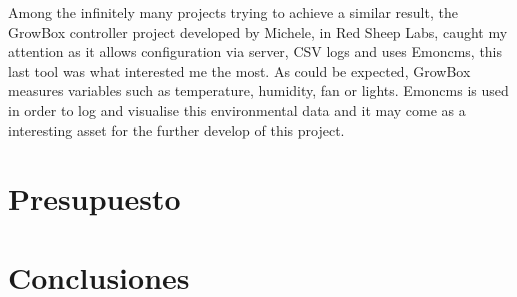 Among the infinitely many projects trying to achieve a similar result, the GrowBox controller project developed by Michele, in Red Sheep Labs\cite{growbox}, caught my attention as it allows configuration via server, CSV logs and uses Emoncms, this last tool was what interested me the most. As could be expected, GrowBox measures variables such as temperature, humidity, fan or lights. Emoncms is used in order to log and visualise this environmental data and it may come as a interesting asset for the further develop of this project.

\section{Presupuesto}

\section{Conclusiones}